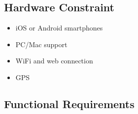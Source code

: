 \subsection{Hardware Constraint}
\begin{itemize}
	\item iOS or Android smartphones
	\item PC/Mac support
	\item WiFi and web connection
	\item GPS
\end{itemize}

\subsection{Functional Requirements}



